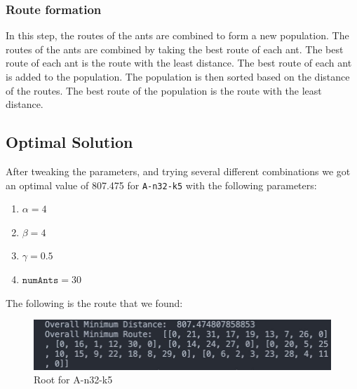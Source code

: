 \documentclass{article}
\begin{document}
\subsubsection{Route formation}
In this step, the routes of the ants are combined to form a new population. The routes of the ants are combined by taking the best route of each ant. The best route of each ant is the route with the least distance. The best route of each ant is added to the population. The population is then sorted based on the distance of the routes. The best route of the population is the route with the least distance.

\subsection{Optimal Solution}
After tweaking the parameters, and trying several different combinations we got an optimal value of 807.475 for \texttt{A-n32-k5} with the following parameters:
\begin{enumerate}
  \item $\alpha = 4$
  \item $\beta = 4$
  \item $\gamma = 0.5$
  \item $\texttt{numAnts} = 30$
\end{enumerate}
The following is the route that we found:
\begin{figure}[H]
  \centering
  \includegraphics[width=1\linewidth]{images/min_dist.jpeg}
  \caption{Root for A-n32-k5}
\end{figure}
\end{document}
